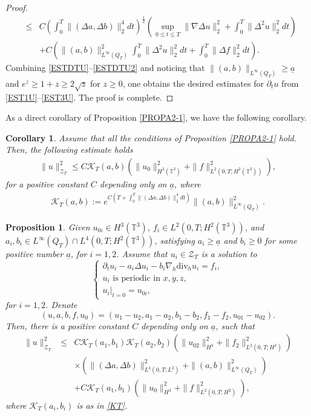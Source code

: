\documentclass[12pt,reqno]{amsart}
\numberwithin{equation}{section}
\newtheorem{corollary}[theorem]{Corollary}
\newtheorem{proposition}[theorem]{Proposition}
\begin{document}
\begin{proof}
\begin{eqnarray}
    &\leq&
    C\left(\int_0^T\|(\Delta a,\Delta b)\|_2^4dt\right)^\frac12\left(\sup_{0\leq t\leq T}\|\nabla\Delta u\|_2^2+
    \int_0^T\|\Delta^2 u\|_2^2dt\right)\nonumber\\
    &&+C\left(\|(a,b)\|_{L^\infty(Q_T)}^2\int_0^T\|\Delta^2 u\|_2^2dt+ \int_0^T\|\Delta f\|_2^2dt\right).\label{ESTDTU2}
  \end{eqnarray}
Combining \eqref{ESTDTU}--\eqref{ESTDTU2} and noticing that $\|(a,b)\|_{L^\infty(Q_T)}\geq\underline a$ and $e^z\geq 1+z\geq2\sqrt z$ for $z\geq0$, one obtains the desired estimates for $\partial_tu$
from \eqref{EST1U}--\eqref{EST3U}.
The proof is complete.
\end{proof}

As a direct corollary of Proposition \ref{PROPA2-1}, we have the following corollary.

\begin{corollary}
\label{CORA2-1}
Assume that all the conditions of Proposition \ref{PROPA2-1} hold. Then, the following estimate holds
\begin{eqnarray*}
 \|u\|_{\mathscr{Z}_T}^2
 \leq C\mathcal K_T(a,b)\left(\|u_0\|_{H^3(\mathbb T^3)}^2+\|f\|_{L^2(0,T;H^2(\mathbb T^3))}^2\right),
\end{eqnarray*}
for a positive constant $C$ depending only on $\underline a$, where
\begin{eqnarray}
  \mathcal K_T{(a,b)}:=e^{C\left(T+ \int_0^T\|(\Delta a,\Delta b)\|_2^4dt\right)}\|(a,b)\|_{L^\infty(Q_T)}^2.\label{KT}
\end{eqnarray}
\end{corollary}

\begin{proposition}
  \label{PROPA2-2}
  Given $u_{0i}\in H^3(\mathbb T^3)$, $f_i\in L^2(0,T; H^2(\mathbb T^3))$, and $a_i,b_i\in L^\infty(Q_T)\cap L^4(0,T; H^2(\mathbb T^3))$, satisfying $a_i\geq\underline a$ and $b_i\geq0$ for some positive number $\underline a$, for $i=1,2$. Assume
  that $u_i\in\mathscr{Z}_T$ is a solution to
  \begin{equation*}
  \left\{
  \begin{array}{l}
    \partial_tu_i-a_i\Delta u_i-b_i\nabla_h\text{div}_hu_i=f_i, \\
    u_i \text{ is periodic in }x,y,z,\\
    u_i|_{t=0}=u_{0i} ,
  \end{array}
  \right.
  \end{equation*}
  for $i=1,2$.   Denote
  $$
  (u,a,b,f,u_0)=(u_1-u_2,a_1-a_2,b_1-b_2,f_1-f_2,u_{01}-u_{02}).
  $$
  Then, there is a positive constant $C$ depending only on $\underline a$, such that
\begin{eqnarray*}
\|u\|_{\mathcal Z_T}^2&\leq& C\mathcal K_T(a_1,b_1)\mathcal K_T(a_2,b_2)\left(\|u_{02}\|_{H^3}^2+ \|f_2\|_{L^2(0,T;H^2)}^2\right)\\
&&\times \left(\|(\Delta a,\Delta b)\|_{L^4(0,T;L^2)}^2+\|(a,b)\|_{ L^\infty(Q_T)}^2\right)\\
  &&+C\mathcal K_T(a_1,b_1)\left(\|u_0\|_{H^3}^2+ \|f\|_{L^2(0,T;H^2)}^2\right),
\end{eqnarray*}
where $\mathcal K_T(a_i,b_i)$ is as in \eqref{KT}.
\end{proposition}
\end{document}
